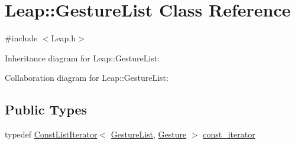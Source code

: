 \hypertarget{class_leap_1_1_gesture_list}{}\section{Leap\+:\+:Gesture\+List Class Reference}
\label{class_leap_1_1_gesture_list}


{\ttfamily \#include $<$Leap.\+h$>$}



Inheritance diagram for Leap\+:\+:Gesture\+List\+:


Collaboration diagram for Leap\+:\+:Gesture\+List\+:
\subsection*{Public Types}
\begin{DoxyCompactItemize}
\item 
typedef \hyperlink{class_leap_1_1_const_list_iterator}{Const\+List\+Iterator}$<$ \hyperlink{class_leap_1_1_gesture_list}{Gesture\+List}, \hyperlink{class_leap_1_1_gesture}{Gesture} $>$ \hyperlink{class_leap_1_1_gesture_list_aaf2fd030e686892a0da42d81fc0cad88}{const\+\_\+iterator}
\end{DoxyCompactItemize}
